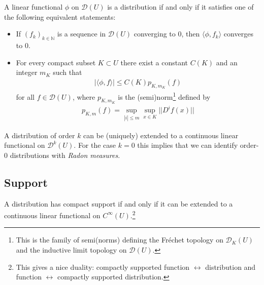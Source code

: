 	\begin{property}
		A linear functional $\phi$ on $\mathcal{D}(U)$ is a distribution if and only if it satisfies one of the following equivalent statements:
		\begin{itemize}
			\item If $(f_k)_{k\in\mathbb{N}}$ is a sequence in $\mathcal{D}(U)$ converging to 0, then $\langle\phi,f_k\rangle$ converges to 0.
			\item For every compact subset $K\subset U$ there exist a constant $C(K)$ and an integer $m_K$ such that
			\begin{gather}
				|\langle\phi,f\rangle|\leq C(K)p_{K, m_K}(f)
			\end{gather}
			for all $f\in\mathcal{D}(U)$, where $p_{K, m_K}$ is the (semi)norm\footnote{This is the family of semi(norms) defining the Fr\'echet topology on $\mathcal{D}_K(U)$ and the inductive limit topology on $\mathcal{D}(U)$.} defined by
			\begin{gather}
				p_{K, m}(f) = \sup_{|i|\leq m}\sup_{x\in K}||D^if(x)||
			\end{gather}
		\end{itemize}
	\end{property}


	\begin{property}
			A distribution of order $k$ can be (uniquely) extended to a continuous linear functional on $\mathcal{D}^k(U)$. For the case $k=0$ this implies that we can identify order-0 distributions with \textit{Radon measures}.
	\end{property}

\subsection{Support}


	\begin{property}
		A distribution has compact support if and only if it can be extended to a continuous linear functional on $C^\infty(U)$.\footnote{This gives a nice duality: compactly supported function $\leftrightarrow$ distribution and function $\leftrightarrow$ compactly supported distribution.}
	\end{property}

